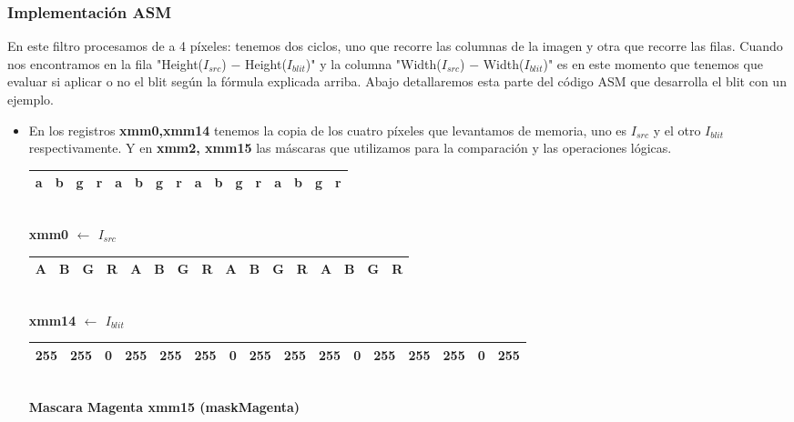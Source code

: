 \subsubsection{Implementación ASM}

En este filtro procesamos de a 4 píxeles: tenemos dos ciclos, uno que recorre las columnas de la imagen y otra que recorre las filas. Cuando nos encontramos en la fila "Height($I_{src}$) $-$ Height($I_{blit}$)" y la columna "Width($I_{src}$) $-$ Width($I_{blit}$)" es en este momento que tenemos que evaluar si aplicar o no el blit según la fórmula explicada arriba. Abajo detallaremos esta parte del código ASM que desarrolla el blit con un ejemplo.	

\begin{itemize}

	\item En los registros \textbf{xmm0,xmm14} tenemos la copia de los cuatro píxeles que levantamos de memoria, uno es $I_{src}$ y el otro $I_{blit}$ respectivamente.
			Y en \textbf{xmm2, xmm15} las máscaras que utilizamos para la comparación y las operaciones lógicas.

		\begin{center}
		   \begin{tabular}{| c | c | c | c || c | c | c | c || c | c | c | c || c | c | c | c |}
			 \hline
			 a & b & g & r & a & b & g & r & a & b & g & r & a & b & g & r \\ \hline
		   \end{tabular}
		   \\ \textbf{xmm0 $\gets$ $I_{src}$ }
		\end{center}

		\begin{center}
		   \begin{tabular}{| c | c | c | c || c | c | c | c || c | c | c | c || c | c | c | c |}
			 \hline
			 A & B & G & R & A & B & G & R & A & B & G & R & A & B & G & R \\ \hline
		   \end{tabular}
		   \\ \textbf{xmm14 $\gets$ $I_{blit}$ }
		\end{center}
		
		 
		\begin{center}
		   \begin{tabular}{| c | c | c | c || c | c | c | c || c | c | c | c || c | c | c | c |}
			 \hline
			 255 & 255 & 0 & 255 & 255 & 255 & 0 & 255 & 255 & 255 & 0 & 255 & 255 & 255 & 0 & 255 \\ \hline
		   \end{tabular}
		   \\  \textbf{Mascara Magenta xmm15 (maskMagenta)}
		\end{center}


\end{itemize}
